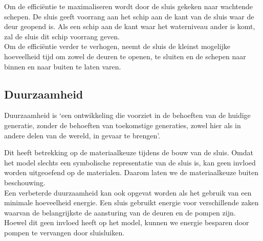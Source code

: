 \documentclass{article} %
\begin{document}
Om de efficiëntie te maximaliseren wordt door de sluis gekeken naar wachtende schepen. De sluis geeft voorrang aan het schip aan de kant van de sluis waar de deur geopend is. Als een schip aan de kant waar het waterniveau ander is komt, zal de sluis dit schip voorrang geven. \\
Om de efficiëntie verder te verhogen, neemt de sluis de kleinst mogelijke hoeveelheid tijd om zowel de deuren te openen, te sluiten en de schepen naar binnen en naar buiten te laten varen.

\subsection{Duurzaamheid}
Duurzaamheid is ‘een ontwikkeling die voorziet in de behoeften van de huidige generatie, zonder de behoeften van toekomstige generaties, zowel hier als in andere delen van de wereld, in gevaar te brengen’. \cite{CBSduurzaamheid} \par

Dit heeft betrekking op de materiaalkeuze tijdens de bouw van de sluis. Omdat het model slechts een symbolische representatie van de sluis is, kan geen invloed worden uitgeoefend op de materialen. Daarom laten we de materiaalkeuze buiten beschouwing. \\
Een verbeterde duurzaamheid kan ook opgevat worden als het gebruik van een minimale hoeveelheid energie. Een sluis gebruikt energie voor verschillende zaken waarvan de belangrijkste de aansturing van de deuren en de pompen zijn. \\
Hoewel dit geen invloed heeft op het model, kunnen we energie besparen door pompen te vervangen door sluisluiken.
\end{document}
